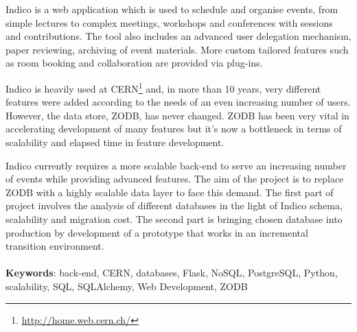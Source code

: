 \begin{abstracts}

\par Indico is a web application which is used to schedule and organise events, from simple lectures to complex meetings, workshops and conferences with sessions and contributions. The tool also includes an advanced user delegation mechanism, paper reviewing, archiving of event materials. More custom tailored features such as room booking and collaboration are provided via plug-ins.
\\
\par Indico is heavily used at \textsc{CERN}\footnote{\url{http://home.web.cern.ch/}} and, in more than 10 years, very different features were added according to the needs of an even increasing number of users. However, the data store, \textsc{ZODB}, has never changed. \textsc{ZODB} has been very vital in accelerating development of many features but it's now a bottleneck in terms of scalability and elapsed time in feature development.
\\
\par Indico currently requires a more scalable back-end to serve an increasing number of events while providing advanced features. The aim of the project is to replace \textsc{ZODB} with a highly scalable data layer to face this demand. The first part of project involves the analysis of different databases in the light of Indico schema, scalability and migration cost. The second part is bringing chosen database into production by development of a prototype that works in an incremental transition environment.
\\
\\
\textbf{Keywords}: back-end, CERN, databases, Flask, NoSQL, PostgreSQL, Python, scalability, SQL, SQLAlchemy, Web Development, ZODB

\end{abstracts}
